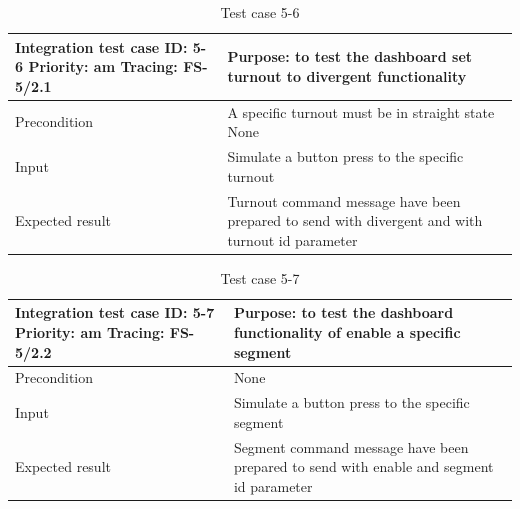 \begin{table}[H]
	\caption{Test case 5-6}
	\label{table:TCase-FS5-6}
	\begin{center}
		\renewcommand{\arraystretch}{1.8}
		\begin{tabu} 
			to 0.9 \textwidth
			{  X[0.4, c] X[c] }
			\toprule
			Integration test case ID: 5-6 \newline Priority: am \newline Tracing: FS-5/2.1 & Purpose: to test the dashboard set turnout to divergent functionality  \\ \midrule
			Precondition                                                                   & A specific turnout must be in straight state None                                                                                                     \\
			Input                                                                          & Simulate a button press to the specific turnout                                \\
			Expected result                                                                & Turnout command message have been prepared to send with divergent and with turnout id parameter \\ \bottomrule
		\end{tabu}
	\end{center}
\end{table}

\begin{table}[H]
	\caption{Test case 5-7}
	\label{table:TCase-FS5-7}
	\begin{center}
		\renewcommand{\arraystretch}{1.8}
		\begin{tabu} 
			to 0.9 \textwidth
			{  X[0.4, c] X[c] }
			\toprule
			Integration test case ID: 5-7 \newline Priority: am \newline Tracing: FS-5/2.2 & Purpose: to test the dashboard functionality of enable a specific segment               \\ \midrule
			Precondition                                                                   & None                                                                           \\
			Input                                                                          & Simulate a button press to the specific segment                                \\
			Expected result                                                                & Segment command message have been prepared to send with enable and segment id parameter \\ \bottomrule
		\end{tabu}
	\end{center}
\end{table}

